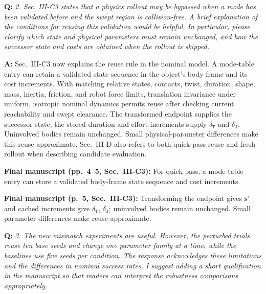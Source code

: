 \documentclass[11pt]{article}
\newcommand{\change}[1]{{\color{blue}#1}}
\begin{document}
\begin{shaded*}
\noindent \textbf{Q:}
{\itshape
2. Sec. III-C3 states that a physics rollout may be bypassed when a mode
has been validated before and the swept region is collision-free. A
brief explanation of the conditions for reusing this validation would
be helpful. In particular, please clarify which state and physical
parameters must remain unchanged, and how the successor state and costs
are obtained when the rollout is skipped.
}
\end{shaded*}

\noindent \textbf{A:}
Sec.~III-C3 now explains the reuse rule in the nominal model. A mode-table
entry can retain a validated state sequence in the object's body frame and its
cost increments. With matching relative states, contacts, twist, duration,
shape, mass, inertia, friction, and robot force limits, translation invariance
under uniform, isotropic nominal dynamics permits reuse after checking current
reachability and swept clearance. The transformed endpoint supplies the successor
state; the stored duration and effort increments supply $\delta_{\texttt{T}}$
and $\delta_{\texttt{J}}$. Uninvolved bodies remain unchanged. Small physical-parameter
differences make this reuse approximate. Sec.~III-D also refers to both
quick-pass reuse and fresh rollout when describing candidate evaluation.
\par\smallskip\noindent\textbf{Final manuscript (pp.~4--5, Sec.~III-C3):}
\change{For quick-pass, a mode-table entry can store a validated body-frame state
sequence and cost increments.}

\par\smallskip\noindent\textbf{Final manuscript (p.~5, Sec.~III-C3):}
\change{Transforming the endpoint gives $\mathbf{s}'$ and cached increments
give $\delta_{\texttt{T}}$, $\delta_{\texttt{J}}$; uninvolved bodies remain
unchanged. Small parameter differences make reuse approximate.}


\begin{shaded*}
\noindent \textbf{Q:}
{\itshape
3. The new mismatch experiments are useful. However, the perturbed
trials reuse ten base seeds and change one parameter family at a time,
while the baselines use five seeds per condition. The response
acknowledges these limitations and the differences in nominal success
rates. I suggest adding a short qualification in the manuscript so that
readers can interpret the robustness comparisons appropriately.
}
\end{shaded*}
\end{document}
